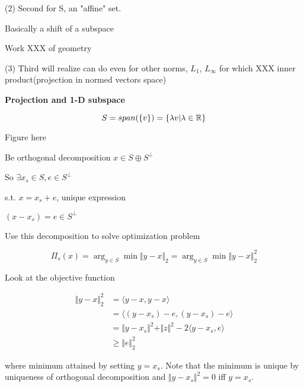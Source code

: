 \begin{marginfigure}
	\centering
	\resizebox{7.5cm}{3cm}{}
	\caption{}
	\label{}
\end{marginfigure}

(2) Second for S, an "affine" set.

\begin{marginfigure}
	\centering
	\resizebox{7.5cm}{3cm}{}
	\caption{}
	\label{}
\end{marginfigure}

Basically a shift of a subspace

Work XXX of geometry

(3) Third will realize can do even for other norms, $L_{1}$, $L_{\infty}$ for which XXX inner product(projection in normed vectors space)


\noindent\textbf{Projection and 1-D subspace}

\begin{marginfigure}
	\centering
	\resizebox{7.5cm}{3cm}{}
	\caption{}
	\label{}
\end{marginfigure}

$$S=span(\{v\})=\{\lambda v|\lambda \in \mathbb{R}\}$$

Figure here

Be orthogonal decomposition  $x\in S\oplus S^{\perp}$

So $\exists x_{s}\in S, e\in S^{\perp}$

s.t. $x=x_{s}+e$, unique expression

$(x-x_{s})=e \in S^{\perp}$

Use this decomposition to solve optimization problem

$$\Pi_{s}(x)=\arg_{y\in S} \min \Vert y-x\Vert_{2}=\arg_{y\in S} \min \Vert y-x\Vert_{2}^{2}$$

Look at the objective function

\begin{align*}
\Vert y-x\Vert_{2}^{2}&=\langle y-x,y-x\rangle\\
&=\langle (y-x_{s})-e,(y-x_{s})-e\rangle\\
&=\Vert y-x_{s}\Vert^{2} + \Vert z\Vert^{2} - 2\langle y-x_{s},e\rangle\\
&\geq \Vert e\Vert_{2}^{2}
\end{align*}

where minimum attained by setting $y=x_{s}$. Note that the minimum is unique by uniqueness of orthogonal decomposition and $\Vert y-x_{s}\Vert^{2}=0$ iff $y=x_{s}$.



